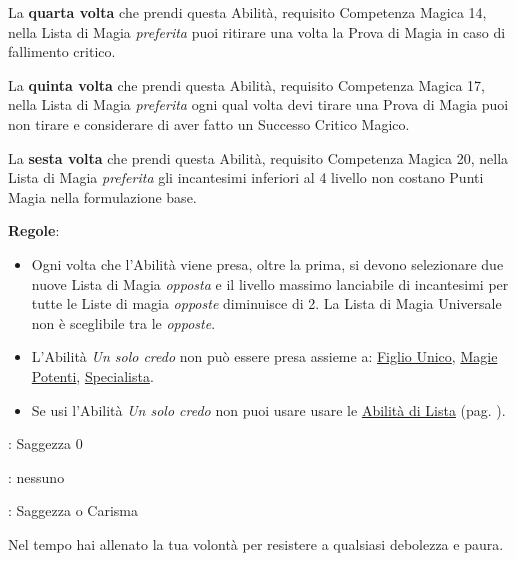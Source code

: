 \begin{multicols}{2}
La \textbf{quarta volta} che prendi questa Abilità, requisito Competenza Magica 14, nella Lista di Magia \emph{preferita} puoi ritirare una volta la Prova di Magia in caso di fallimento critico.

La \textbf{quinta volta} che prendi questa Abilità, requisito Competenza Magica 17, nella Lista di Magia \emph{preferita} ogni qual volta devi tirare una Prova di Magia puoi non tirare e considerare di aver fatto un Successo Critico Magico.

La \textbf{sesta volta} che prendi questa Abilità, requisito Competenza Magica 20, nella Lista di Magia \emph{preferita} gli incantesimi inferiori al 4 livello non costano Punti Magia nella formulazione base.

\medskip

\textbf{Regole}:

\smallskip

\begin{itemize}[leftmargin=*] \setlength{\itemsep}{0pt}
\item Ogni volta che l'Abilità viene presa, oltre la prima, si devono selezionare due nuove Lista di Magia \emph{opposta} e il livello massimo lanciabile di incantesimi per tutte le Liste di magia \emph{opposte} diminuisce di 2.  La Lista di Magia Universale non è sceglibile tra le \emph{opposte}.

\item L'Abilità \emph{Un solo credo} non può essere presa assieme a: \hyperlink{figliounico}{Figlio Unico}, \hyperlink{magiepotenti}{Magie Potenti}, \hyperlink{specialista}{Specialista}.

\item Se usi l'Abilità \emph{Un solo credo} non puoi usare usare le \hyperlink{abilitadilista}{Abilità di Lista} (pag. \pageref{abilitadilista}).
\end{itemize}

\begin{description}[noitemsep, topsep=0pt, parsep=0pt, partopsep=0pt, leftmargin=0cm, labelwidth=2.5cm]
    \item[\textbf{Requisito}]: Saggezza 0
    \item[\textbf{Tiri Salvezza}]: nessuno
    \item[\textbf{Caratteristica}]: Saggezza o Carisma
\end{description}

Nel tempo hai allenato la tua volontà per resistere a qualsiasi debolezza e paura.


\end{multicols}
